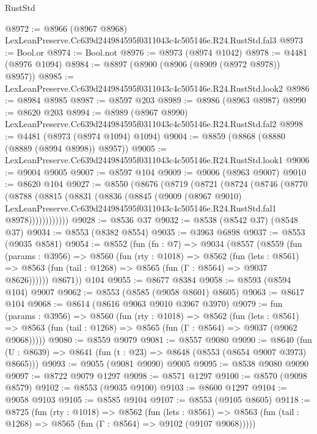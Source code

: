 \begin{lexlean}{RustStd}
\begin{coremodule}
@8972 := @8966 (@8967 @8968) LexLeanPreserve.Cc639d244984595f0311043c4c505146e.R24.RustStd.fal3
@8973 := Bool.or
@8974 := Bool.not
@8976 := @8973 (@8974 @1042)
@8978 := @4481 (@8976 @1094)
@8984 := @8897 (@8900 (@8906 (@8909 (@8972 @8978)) @8957))
@8985 := LexLeanPreserve.Cc639d244984595f0311043c4c505146e.R24.RustStd.look2
@8986 := @8984 @8985
@8987 := @8597 @203
@8989 := @8986 (@8963 @8987)
@8990 := @8620 @203
@8994 := @8989 (@8967 @8990) LexLeanPreserve.Cc639d244984595f0311043c4c505146e.R24.RustStd.fal2
@8998 := @4481 (@8973 (@8974 @1094) @1094)
@9004 := @8859 (@8868 (@8880 (@8889 (@8994 @8998)) @8957))
@9005 := LexLeanPreserve.Cc639d244984595f0311043c4c505146e.R24.RustStd.look1
@9006 := @9004 @9005
@9007 := @8597 @104
@9009 := @9006 (@8963 @9007)
@9010 := @8620 @104
@9027 := @8550
    (@8676
      (@8719
        (@8721
          (@8724
            (@8746
              (@8770
                (@8788
                  (@8815
                    (@8831
                      (@8836
                        (@8845
                          (@9009
                            (@8967 @9010)
                            LexLeanPreserve.Cc639d244984595f0311043c4c505146e.R24.RustStd.fal1
                            @8978))))))))))))
@9028 := @8536 @37
@9032 := @8538 (@8542 @37) (@8548 @37)
@9034 := @8553 (@8382 @8554)
@9035 := @3963 @6898
@9037 := @8553 (@9035 @8581)
@9054 := @8552
    (fun (fn : @7) =>
    @9034
      (@8557
        (@8559
          (fun (params : @3956) =>
          @8560
            (fun (rty : @1018) =>
            @8562
              (fun (lets : @8561) =>
              @8563 (fun (tail : @1268) => @8565 (fun (Γ : @8564) => @9037 @8626))))))
        @8671))
    @104
@9055 := @8677 @8384
@9058 := @8593 (@8594 @104) @9007
@9062 := @8553 (@8585 (@9058 @8601) @8605)
@9063 := @8617 @104
@9068 := @8614 (@8616 @9063 @9010 @3967 @3970)
@9079 := fun (params : @3956) =>
  @8560
    (fun (rty : @1018) =>
    @8562
      (fun (lets : @8561) =>
      @8563 (fun (tail : @1268) => @8565 (fun (Γ : @8564) => @9037 (@9062 @9068)))))
@9080 := @8559 @9079
@9081 := @8557 @9080
@9090 := @8640 (fun (U : @8639) => @8641 (fun (t : @23) => @8648 (@8553 (@8654 @9007 @3973) @8665)))
@9093 := @9055 (@9081 @9090) @9005
@9095 := @8538 @9080 @9090
@9097 := @8722 @9079 @1297
@9098 := @8571 @1297
@9100 := @8570 (@9098 @8579)
@9102 := @8553 (@9035 @9100)
@9103 := @8600 @1297
@9104 := @9058 @9103
@9105 := @8585 @9104
@9107 := @8553 (@9105 @8605)
@9118 := @8725
    (fun (rty : @1018) =>
    @8562
      (fun (lets : @8561) =>
      @8563 (fun (tail : @1268) => @8565 (fun (Γ : @8564) => @9102 (@9107 @9068)))))

\end{coremodule}
\end{lexlean}
